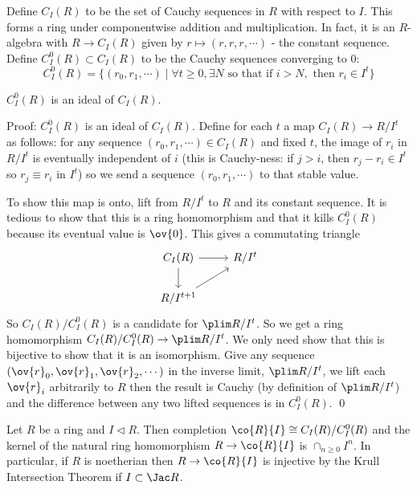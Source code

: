 \begin{dfn}[$C_I(R)$]
Define $C_I(R)$ to be the set of Cauchy sequences in $R$ with respect to $I$. This forms a ring under componentwise addition and multiplication. In fact, it is an $R$-algebra with $R \to C_I(R)$ given by $r \mapsto (r,r,r,\cdots)$ - the constant sequence. Define $C^0_I(R) \subset C_I(R)$ to be the Cauchy sequences converging to 0:
\[
C^0_I(R)=\{(r_0,r_1,\cdots) \;|\; \forall t \geq 0, \exists N \text{ so that if } i >N, \text{ then }r_i \in I^t\}
\]
\end{dfn}

\begin{prop}
$C_I^0(R)$ is an ideal of $C_I(R)$.
\end{prop}

\noindent Proof: $C_I^0(R)$ is an ideal of $C_I(R)$. Define for each $t$ a map $C_I(R) \to R/I^t$ as follows: for any sequence $(r_0,r_1,\cdots) \in C_I(R)$ and fixed $t$, the image of $r_i$ in $R/I^t$ is eventually independent of $i$ (this is Cauchy-ness: if $j>i$, then $r_j-r_i \in I^t$ so $r_j \equiv r_i$ in $I^t$) so we send a sequence $(r_0,r_1,\cdots)$ to that stable value. 

To show this map is onto, lift from $R/I^t$ to $R$ and its constant sequence. It is tedious to show that this is a ring homomorphism and that it kills $C_I^0(R)$ because its eventual value is $\ov{0}$. This gives a commutating triangle
\[
\begin{tikzcd}
C_I(R) \arrow{r} \arrow{d} & R/I^t \\
R/I^{t+1} \arrow{ur} & 
\end{tikzcd}
\]
So $C_I(R)/C^0_I(R)$ is a candidate for $\plim R/I^t$. So we get a ring homomorphism $C_I(R)/C_I^0(R) \to \plim R/I^t$. We only need show that this is bijective to show that it is an isomorphism. Give any sequence $(\ov{r}_0,\ov{r}_1,\ov{r}_2,\cdots)$ in the inverse limit, $\plim R/I^t$, we lift each $\ov{r}_i$ arbitrarily to $R$ then the result is Cauchy (by definition of $\plim R/I^t$) and the difference between any two lifted sequences is in $C_I^0(R)$. \qed \\

\begin{thmm}
Let $R$ be a ring and $I \lhd R$. Then completion $\co{R}{I} \cong C_I(R)/C_I^0(R)$ and the kernel of the natural ring homomorphism $R \to \co{R}{I}$ is $\cap_{n \geq 0} I^n$. In particular, if $R$ is noetherian then $R \to \co{R}{I}$ is injective by the Krull Intersection Theorem if $I \subset \Jac R$. 
\end{thmm}

